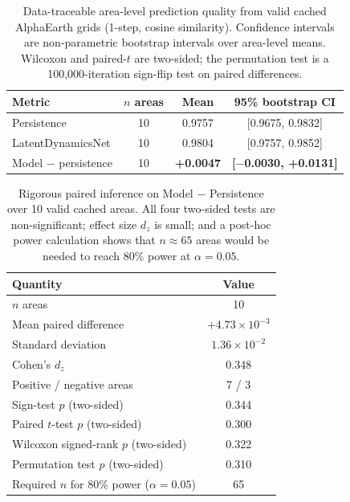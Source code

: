 \documentclass{article}
\begin{document}
\begin{table}[htbp]
\centering
\caption{Data-traceable area-level prediction quality from valid cached AlphaEarth grids (1-step, cosine similarity). Confidence intervals are non-parametric bootstrap intervals over area-level means. Wilcoxon and paired-$t$ are two-sided; the permutation test is a 100{,}000-iteration sign-flip test on paired differences.}
\label{tab:aggregate}
\begin{tabular}{lccc}
\toprule
Metric & $n$ areas & Mean & 95\% bootstrap CI \\
\midrule
Persistence & 10 & 0.9757 & [0.9675, 0.9832] \\
LatentDynamicsNet & 10 & 0.9804 & [0.9757, 0.9852] \\
Model $-$ persistence & 10 & \textbf{+0.0047} & \textbf{[$-$0.0030, +0.0131]} \\
\bottomrule
\end{tabular}
\end{table}

\begin{table}[htbp]
\centering
\caption{Rigorous paired inference on Model $-$ Persistence over 10 valid cached areas. All four two-sided tests are non-significant; effect size $d_z$ is small; and a post-hoc power calculation shows that $n \approx 65$ areas would be needed to reach 80\% power at $\alpha=0.05$.}
\label{tab:paired_inference}
\small
\begin{tabular}{lc}
\toprule
Quantity & Value \\
\midrule
$n$ areas & 10 \\
Mean paired difference & $+4.73 \times 10^{-3}$ \\
Standard deviation & $1.36 \times 10^{-2}$ \\
Cohen's $d_z$ & 0.348 \\
Positive / negative areas & 7 / 3 \\
Sign-test $p$ (two-sided) & 0.344 \\
Paired $t$-test $p$ (two-sided) & 0.300 \\
Wilcoxon signed-rank $p$ (two-sided) & 0.322 \\
Permutation test $p$ (two-sided) & 0.310 \\
Required $n$ for 80\% power ($\alpha=0.05$) & 65 \\
\bottomrule
\end{tabular}
\end{table}
\end{document}

